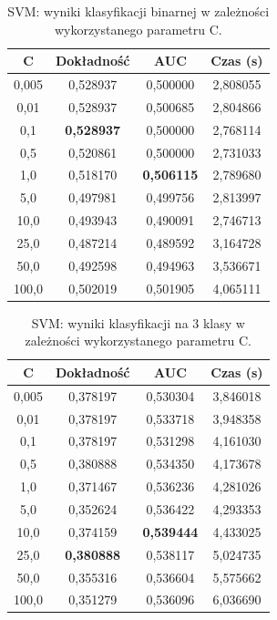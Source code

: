 \documentclass[a4paper, twoside, 11pt, openright]{article}
\begin{document}
\begin{table}[H]
    \centering
    \begin{tabular}{|c|c|c|c|}
    \hline
        \textbf{C} & \textbf{Dokładność} & \textbf{AUC} & \textbf{Czas (s)} \\ \hline
0,005 &  0,528937 &  0,500000 &    2,808055 \\ \hline
0,01  &  0,528937 &  0,500685 &    2,804866 \\ \hline
0,1   &  \textbf{0,528937} &  0,500000 &    2,768114 \\ \hline
0,5   &  0,520861 &  0,500000 &    2,731033 \\ \hline
1,0   &  0,518170 &  \textbf{0,506115} &    2,789680 \\ \hline
5,0   &  0,497981 &  0,499756 &    2,813997 \\ \hline
10,0  &  0,493943 &  0,490091 &    2,746713 \\ \hline
25,0  &  0,487214 &  0,489592 &    3,164728 \\ \hline
50,0  &  0,492598 &  0,494963 &    3,536671 \\ \hline
100,0 &  0,502019 &  0,501905 &    4,065111 \\ \hline

    \end{tabular}
    \caption{SVM: wyniki klasyfikacji binarnej w zależności wykorzystanego parametru C.}
    \label{tab:svm_c_binary}
\end{table}


\begin{table}[H]
    \centering
    \begin{tabular}{|c|c|c|c|}
    \hline
        \textbf{C} & \textbf{Dokładność} & \textbf{AUC} & \textbf{Czas (s)} \\ \hline
0,005 &  0,378197 &  0,530304 &    3,846018 \\ \hline
0,01  &  0,378197 &  0,533718 &    3,948358 \\ \hline
0,1   &  0,378197 &  0,531298 &    4,161030 \\ \hline
0,5   &  0,380888 &  0,534350 &    4,173678 \\ \hline
1,0   &  0,371467 &  0,536236 &    4,281026 \\ \hline
5,0   &  0,352624 &  0,536422 &    4,293353 \\ \hline
10,0  &  0,374159 &  \textbf{0,539444} &    4,433025 \\ \hline
25,0  &  \textbf{0,380888} &  0,538117 &    5,024735 \\ \hline
50,0  &  0,355316 &  0,536604 &    5,575662 \\ \hline
100,0 &  0,351279 &  0,536096 &    6,036690 \\ \hline
    \end{tabular}
    \caption{SVM: wyniki klasyfikacji na 3 klasy w zależności wykorzystanego parametru C.}
    \label{tab:svm_c_discrete}
\end{table}
\end{document}
